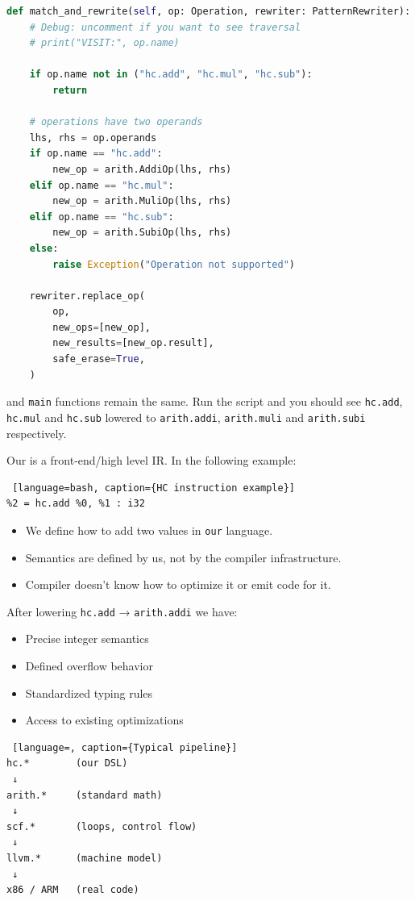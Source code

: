 \documentclass[../main.tex]{subfiles}
\begin{document}
\begin{lstlisting}[language=Python, caption={build\_context snippet}]
def match_and_rewrite(self, op: Operation, rewriter: PatternRewriter):
    # Debug: uncomment if you want to see traversal
    # print("VISIT:", op.name)

    if op.name not in ("hc.add", "hc.mul", "hc.sub"):
        return

    # operations have two operands
    lhs, rhs = op.operands
    if op.name == "hc.add":
        new_op = arith.AddiOp(lhs, rhs)
    elif op.name == "hc.mul":
        new_op = arith.MuliOp(lhs, rhs)
    elif op.name == "hc.sub":
        new_op = arith.SubiOp(lhs, rhs)
    else:
        raise Exception("Operation not supported")

    rewriter.replace_op(
        op,
        new_ops=[new_op],
        new_results=[new_op.result],
        safe_erase=True,
    )
\end{lstlisting}

 and \texttt{main} functions remain the same. Run the script and you should see
\texttt{hc.add}, \texttt{hc.mul} and \texttt{hc.sub} lowered to
\texttt{arith.addi}, \texttt{arith.muli} and \texttt{arith.subi} respectively.

Our  is a front-end/high level IR. In the following example:

\begin{lstlisting} [language=bash, caption={HC instruction example}]
%2 = hc.add %0, %1 : i32
\end{lstlisting}
\begin{itemize}
    \item We define how to add two values in \texttt{our} language.
    \item Semantics are defined by us, not by the compiler infrastructure.
    \item Compiler doesn't know how to optimize it or emit code for it.
\end{itemize}
After lowering \texttt{hc.add}  →  \texttt{arith.addi} we have:
\begin{itemize}
    \item Precise integer semantics
    \item Defined overflow behavior
    \item Standardized typing rules
    \item Access to existing optimizations
\end{itemize}

\begin{lstlisting} [language=, caption={Typical pipeline}]
hc.*        (our DSL)
 ↓
arith.*     (standard math)
 ↓
scf.*       (loops, control flow)
 ↓
llvm.*      (machine model)
 ↓
x86 / ARM   (real code)
\end{lstlisting}
\end{document}
